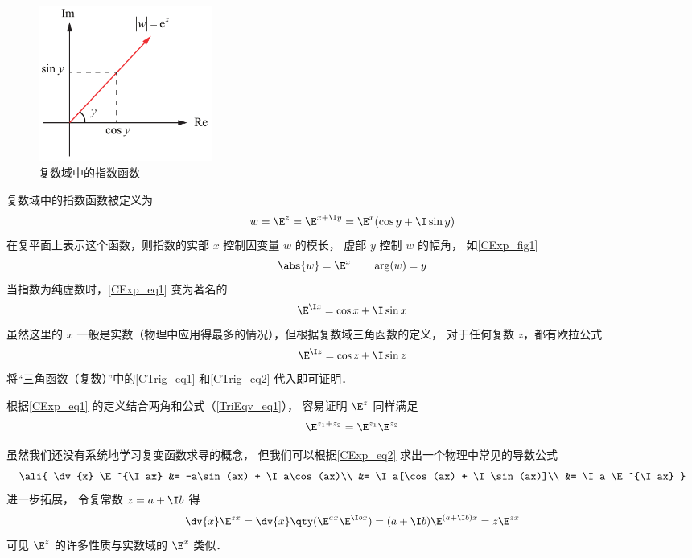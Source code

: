 


\begin{figure}[ht]
\centering
\includegraphics[width=5.7cm]{./figures/CExp1.pdf}
\caption{复数域中的指数函数} \label{CExp_fig1}
\end{figure}

复数域中的指数函数被定义为
 \begin{equation}\label{CExp_eq1}
w = \E^z = \E^{x + \I y} = \E^x(\cos y + \I\sin y)
\end{equation}
在复平面上表示这个函数，则指数的实部 $x$ 控制因变量 $w$ 的模长， 虚部 $y$ 控制 $w$ 的幅角， 如\autoref{CExp_fig1}
 \begin{equation}
\abs{w} = \E^x \qquad \arg(w) = y
\end{equation}
当指数为纯虚数时，\autoref{CExp_eq1} 变为著名的
\begin{equation}\label{CExp_eq2}
\E^{\I x} = \cos x + \I\sin x
\end{equation}
虽然这里的 $x$ 一般是实数（物理中应用得最多的情况），但根据复数域三角函数的定义， 对于任何复数 $z$，都有欧拉公式
\begin{equation}
\E^{\I z} = \cos z + \I\sin z
\end{equation}
将“三角函数（复数）”中的\autoref{CTrig_eq1} 和\autoref{CTrig_eq2} 代入即可证明．

根据\autoref{CExp_eq1} 的定义结合两角和公式（\autoref{TriEqv_eq1}）， 容易证明 $\E^z$ 同样满足
\begin{equation}
\E^{z_1 + z_2} = \E^{z_1}\E^{z_2}
\end{equation}

虽然我们还没有系统地学习复变函数求导的概念， 但我们可以根据\autoref{CExp_eq2} 求出一个物理中常见的导数公式
\begin{equation}\ali{
\dv{x} \E^{\I ax} &= -a\sin(ax) + \I a\cos(ax)\\
&= \I a[\cos(ax) + \I \sin(ax)]\\
&= \I a \E^{\I ax}
}\end{equation}
进一步拓展， 令复常数 $z = a + \I b$ 得
\begin{equation}
\dv{x}\E^{z x} = \dv{x} \qty(\E^{ax}\E^{\I bx}) = (a + \I b)\E^{(a+\I b)x} = z\E^{zx}
\end{equation}
可见 $\E^z$ 的许多性质与实数域的 $\E^x$ 类似．



